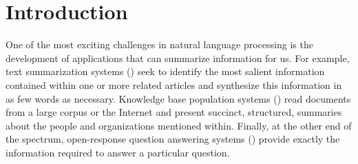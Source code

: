 
\chapter{\label{chap:intro} Introduction}

One of the most exciting challenges in natural language processing is the development of applications that can summarize information for us.
For example, text summarization systems () seek to identify the most salient information contained within one or more related articles and synthesize this information in as few words as necessary.
Knowledge base population systems () read documents from a large corpus or the Internet and present succinct, structured, summaries about the people and organizations mentioned within.
Finally, at the other end of the spectrum, open-response question answering systems () provide exactly the information required to answer a particular question.

